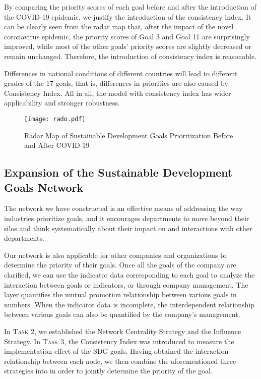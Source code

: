 \documentclass[12pt]{article}  %
\begin{document}
By comparing the priority scores of each goal before and after the introduction of the COVID-19 epidemic, we justify the introduction of the consistency index. It can be clearly seen from the radar map that, after the impact of the novel coronavirus epidemic, the priority scores of Goal 3 and Goal 11 are surprisingly improved, while most of the other goals' priority scores are slightly decreased or remain unchanged. Therefore, the introduction of consistency index is reasonable. 

Differences in national conditions of different countries will lead to different grades of the 17 goals, that is, differences in priorities are also caused by Consistency Index. All in all, the model with consistency index has wider applicability and stronger robustness.

\begin{figure}[htbp]
\centering
\texttt{[image: rado.pdf]}
\caption{Radar Map of Sustainable Development Goals Prioritization Before and After COVID-19}\label{fig:6.1}
\end{figure}

\subsection{ Expansion of the Sustainable Development Goals Network}

The network we have constructed is an effective means of addressing the way industries prioritize goals, and it encourages departments to move beyond their silos and think systematically about their impact on and interactions with other departments. 

 Our network is also applicable for other companies and organizations to determine the priority of their goals. Once all the goals of the company are clarified, we can use the indicator data corresponding to each goal to analyze the interaction between goals or indicators, or through company management. The layer quantifies the mutual promotion relationship between various goals in numbers.
When the indicator data is incomplete, the interdependent relationship between various goals can also be quantified by the company's management. 


In \textsc{Task 2}, we established the Network Centrality Strategy and the Influence Strategy. In \textsc{Task 3}, the Consistency Index was introduced to measure the implementation effect of the SDG goals. Having obtained the interaction relationship between each node, we then combine the aforementioned three strategies into  in order to jointly determine the priority of the goal.
\end{document}
